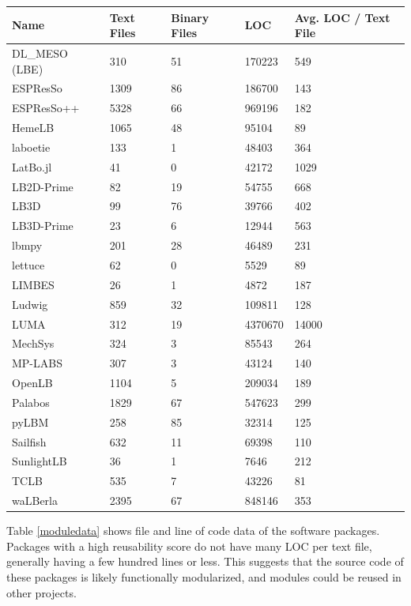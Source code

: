 \documentclass[12pt, notitlepage]{article}
\begin{document}
	\begin{center}
		\begin{onehalfspacing}
		\begin{tabular}{ p{3.5cm}p{2cm}p{2.5cm}p{2cm}p{2.5cm} }
			\hline
			Name & Text Files & Binary Files & LOC & Avg. LOC / Text File\\
			\hline
			DL\_MESO (LBE) & 310 & 51 & 170223& 549\\
			ESPResSo &1309& 86 & 186700&143\\
			ESPResSo++ &5328& 66 & 969196&182\\
			HemeLB &1065& 48 & 95104&89\\
			laboetie &133& 1 & 48403&364\\		
			LatBo.jl &41& 0 & 42172&1029\\
			LB2D-Prime &82& 19 & 54755&668\\
			LB3D &99& 76 & 39766&402\\
			LB3D-Prime &23& 6 & 12944&563\\
			lbmpy&201&  28 & 46489  &231\\
			lettuce &62& 0 & 5529&89\\
			LIMBES &26& 1 & 4872&187\\
			Ludwig&859& 32 & 109811&128\\
			LUMA&312& 19 & 4370670&14000\\
			MechSys &324& 3 & 85543&264\\
			MP-LABS &307& 3 & 43124&140\\
			OpenLB &1104& 5 & 209034&189\\
			Palabos &1829& 67 & 547623&299\\
			pyLBM &258& 85& 32314&125\\
			Sailfish &632& 11 & 69398&110\\
			SunlightLB & 36& 1 & 7646& 212\\
			TCLB &535& 7 & 43226&81\\
			waLBerla & 2395 & 67 & 848146&353\\
			\hline
		\end{tabular}
		\label{moduledata}
		\end{onehalfspacing}
	\end{center}

Table \ref{moduledata} shows file and line of code data of the software packages. Packages with a high reusability score do not have many LOC per text file, generally having a few hundred lines or less. This suggests that the source code of these packages is likely functionally modularized, and modules could be reused in other projects.
\end{document}
